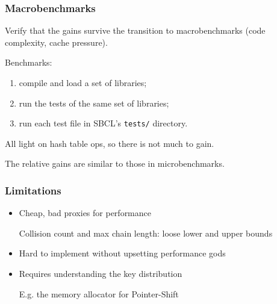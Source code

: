 \documentclass[onlytextwidth,usepdftitle=false]{beamer}
\newcommand\inlinett[1]{\texttt{\fontsize{10pt}{12pt}\selectfont #1}}
\newcommand\toplevellist{%
  \settowidth{\leftmargini}{\usebeamertemplate{itemize item}}
  \addtolength{\leftmargini}{\labelsep}}
\newcommand\looselist{\setlength{\parskip}{1\baselineskip}}
\newcommand\mglconclusion[1]{\textcolor{mglred2}{\textbf{\maltese} #1}}
\begin{document}
\begin{frame}
\begin{columns}
\begin{column}{.60\linewidth}
\begin{figure}[H]
\end{figure}
\begin{figure}[H]
\end{figure}
\end{column}
\end{columns}
\end{frame}

\begin{frame}
\frametitle{Macrobenchmarks}
Verify that the gains survive the transition to macrobenchmarks (code complexity, cache pressure).

Benchmarks:
{
\setlength{\parskip}{0pt}
\begin{enumerate}
\item compile and load a set of libraries;
\item run the tests of the same set of libraries;
\item run each test file in SBCL's \inlinett{tests/} directory.
\end{enumerate}
}
All light on hash table ops, so there is not much to gain.

\mglconclusion{The relative gains are similar to those in microbenchmarks.}
\end{frame}

\begin{frame}
\frametitle{Limitations}
\toplevellist
\begin{itemize}
\looselist
\item Cheap, bad proxies for performance

Collision count and max chain length: loose lower and upper bounds
\item Hard to implement without upsetting performance gods
\item Requires understanding the key distribution

E.g. the memory allocator for Pointer-Shift
\end{itemize}
\end{frame}
\end{document}
